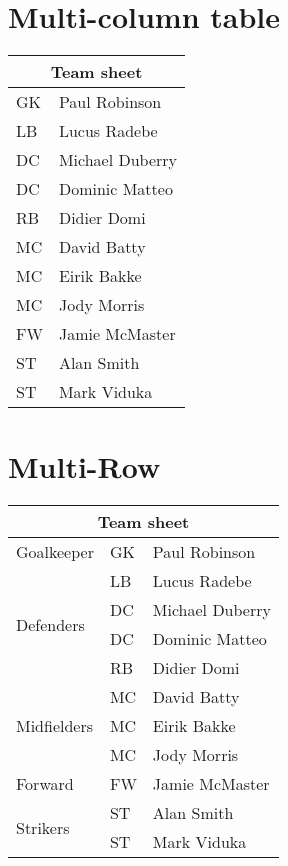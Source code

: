 \section{Multi-column table}
\begin{tabular}{|l|l|}
  \hline
  \multicolumn{2}{|c|}{Team sheet} \\
  \hline
  GK & Paul Robinson \\
  LB & Lucus Radebe \\
  DC & Michael Duberry \\
  DC & Dominic Matteo \\
  RB & Didier Domi \\
  MC & David Batty \\
  MC & Eirik Bakke \\
  MC & Jody Morris \\
  FW & Jamie McMaster \\
  ST & Alan Smith \\
  ST & Mark Viduka \\
  \hline
\end{tabular}

\section{Multi-Row}
\begin{tabular}{|l|l|l|}
\hline
\multicolumn{3}{|c|}{Team sheet} \\
\hline
Goalkeeper & GK & Paul Robinson \\ \hline
\multirow{4}{*}{Defenders} & LB & Lucus Radebe \\
 & DC & Michael Duberry \\
 & DC & Dominic Matteo \\
 & RB & Didier Domi \\ \hline
\multirow{3}{*}{Midfielders} & MC & David Batty \\
 & MC & Eirik Bakke \\
 & MC & Jody Morris \\ \hline
Forward & FW & Jamie McMaster \\ \hline
\multirow{2}{*}{Strikers} & ST & Alan Smith \\
 & ST & Mark Viduka \\
\hline
\end{tabular}

